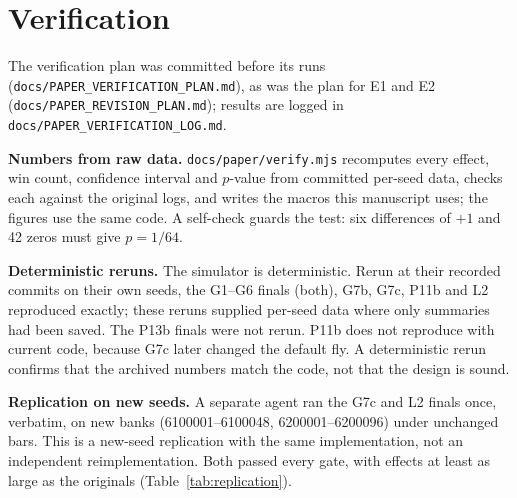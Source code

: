 \documentclass[11pt]{article}
\begin{document}
\section{Verification}
\label{sec:verification}

The verification plan was committed before its runs (\texttt{docs/PAPER\_VERIFICATION\_PLAN.md}), as was the plan for E1 and E2 (\texttt{docs/PAPER\_REVISION\_PLAN.md}); results are logged in \texttt{docs/PAPER\_VERIFICATION\_LOG.md}.

\textbf{Numbers from raw data.} \texttt{docs/paper/verify.mjs} recomputes every effect, win count, confidence interval and $p$-value from committed per-seed data, checks each against the original logs, and writes the macros this manuscript uses; the figures use the same code. A self-check guards the test: six differences of $+1$ and 42 zeros must give $p=1/64$.

\textbf{Deterministic reruns.} The simulator is deterministic. Rerun at their recorded commits on their own seeds, the G1--G6 finals (both), G7b, G7c, P11b and L2 reproduced exactly; these reruns supplied per-seed data where only summaries had been saved. The P13b finals were not rerun. P11b does not reproduce with current code, because G7c later changed the default fly. A deterministic rerun confirms that the archived numbers match the code, not that the design is sound.

\textbf{Replication on new seeds.} A separate agent ran the G7c and L2 finals once, verbatim, on new banks (6100001--6100048, 6200001--6200096) under unchanged bars. This is a new-seed replication with the same implementation, not an independent reimplementation. Both passed every gate, with effects at least as large as the originals (Table~\ref{tab:replication}).
\end{document}
